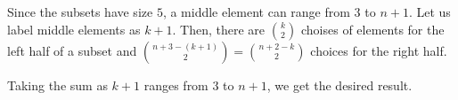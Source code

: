 Since the subsets have size $5$, a middle element can range from $3$ to $n+1$. 
Let us label middle elements as $k+1$. Then, there are ${k \choose 2}$ choises 
of elements for the left half of a subset and 
${n+3-(k+1) \choose 2} = {n+2-k \choose 2}$ choices for the right half.

Taking the sum as $k+1$ ranges from $3$ to $n+1$, we get the desired result.